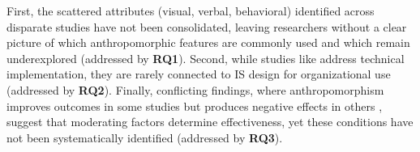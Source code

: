 \documentclass[manuscript,anonymous,sigconf]{acmart}
\begin{document}
First, the scattered attributes (visual, verbal, behavioral) identified across disparate studies have not been consolidated, leaving researchers without a clear picture of which anthropomorphic features are commonly used and which remain underexplored (addressed by \textbf{RQ1}). Second, while studies like \citet{zhang2018personalizing} address technical implementation, they are rarely connected to IS design for organizational use (addressed by \textbf{RQ2}). Finally, conflicting findings, where anthropomorphism improves outcomes in some studies \citep{go2019humanizing} but produces negative effects in others \citep{crolic2022blame}, suggest that moderating factors determine effectiveness, yet these conditions have not been systematically identified (addressed by \textbf{RQ3}).
\end{document}
